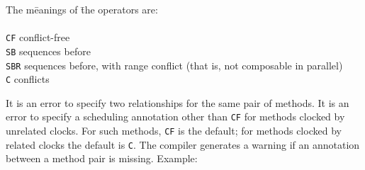 \documentclass[twoside,letterpaper]{article}
\begin{document}
\begin{tabbing}
The m\=eanings of \= the operators are: \\
\\
\>\texttt{CF} \>      conflict-free \\
\>\texttt{SB} \>     sequences before \\
\>\texttt{SBR} \>     sequences before, with range conflict (that is,
not  composable in parallel) \\
\>\texttt{C} \>       conflicts 
\end{tabbing}
It is an error to specify two relationships for the same pair of methods.
It is an error to specify a scheduling annotation other than \texttt{CF} for
methods clocked by unrelated clocks. For such methods, \texttt{CF} is the
default; for methods clocked by related clocks the default is
\texttt{C}.  The compiler generates a warning if an annotation between a method
pair is missing.
Example:
\end{document}
